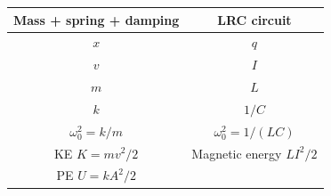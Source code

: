 \documentclass[11pt]{article}
\begin{document}
\begin{longtable}[]{@{}cc@{}}
\toprule
\begin{minipage}[b]{0.47\columnwidth}\centering
Mass + spring + damping\strut
\end{minipage} & \begin{minipage}[b]{0.47\columnwidth}\centering
LRC circuit\strut
\end{minipage}\tabularnewline
\midrule
\endhead
\begin{minipage}[t]{0.47\columnwidth}\centering
\(x\)\strut
\end{minipage} & \begin{minipage}[t]{0.47\columnwidth}\centering
\(q\)\strut
\end{minipage}\tabularnewline
\begin{minipage}[t]{0.47\columnwidth}\centering
\(v\)\strut
\end{minipage} & \begin{minipage}[t]{0.47\columnwidth}\centering
\(I\)\strut
\end{minipage}\tabularnewline
\begin{minipage}[t]{0.47\columnwidth}\centering
\(m\)\strut
\end{minipage} & \begin{minipage}[t]{0.47\columnwidth}\centering
\(L\)\strut
\end{minipage}\tabularnewline
\begin{minipage}[t]{0.47\columnwidth}\centering
\(k\)\strut
\end{minipage} & \begin{minipage}[t]{0.47\columnwidth}\centering
\(1/C\)\strut
\end{minipage}\tabularnewline
\begin{minipage}[t]{0.47\columnwidth}\centering
\(\omega_0^2=k/m\)\strut
\end{minipage} & \begin{minipage}[t]{0.47\columnwidth}\centering
\(\omega_0^2=1/(LC)\)\strut
\end{minipage}\tabularnewline
\begin{minipage}[t]{0.47\columnwidth}\centering
KE \(K=mv^2/2\)\strut
\end{minipage} & \begin{minipage}[t]{0.47\columnwidth}\centering
Magnetic energy \(LI^2/2\)\strut
\end{minipage}\tabularnewline
\begin{minipage}[t]{0.47\columnwidth}\centering
PE \(U=kA^2/2\)\strut
\end{minipage} & \begin{minipage}[t]{0.47\columnwidth}\centering

\end{minipage}
\end{longtable}
\end{document}
